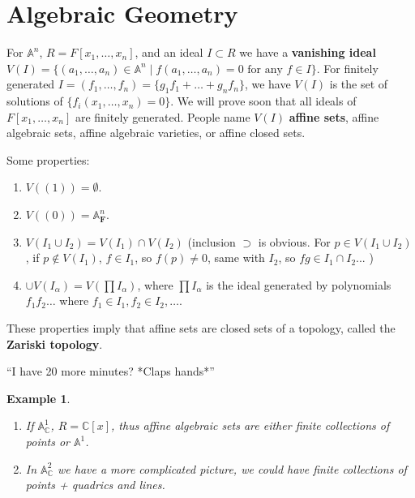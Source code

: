 \documentclass[12pt]{article}
\newcommand{\F}{\mathbf{F}}
\newcommand{\C}{\mathbb{C}}
\newcommand{\A}{\mathbb{A}}
\newtheorem{example}[]{Example}
\begin{document}
\section{Algebraic Geometry}
    For $\A^n$, $R = F[x_1, \dots, x_n]$, and an ideal $I \subset R$ we have a \textbf{vanishing ideal} $V(I) = \{(a_1, \dots, a_n) \in \A^n \mid f(a_1, \dots, a_n) = 0 \text{ for any } f \in I\}$. For finitely generated $I = (f_1,\dots, f_n) = \{g_1f_1 + \dots + g_nf_n\}$, we have $V(I)$ is the set of solutions of $\{f_i(x_1, \dots, x_n) = 0\}$. We will prove soon that all ideals of $F[x_1, \dots, x_n]$ are finitely generated. People name $V(I)$ \textbf{affine sets}, affine algebraic sets, affine algebraic varieties, or affine closed sets. \par 
    Some properties: 
    \begin{enumerate}
        \item $V((1)) = \emptyset$.
        \item $V((0)) = \A^n_\F$.
        \item $V(I_1 \cup I_2) = V(I_1) \cap V(I_2)$ (inclusion $\supset$ is obvious. For $p \in V(I_1 \cup I_2)$, if $p \not \in V(I_1)$, $f \in I_1$, so $f(p) \neq 0$, same with $I_2$, so $fg \in I_1 \cap I_2$... )
        \item $\cup V(I_\alpha) = V(\prod I_\alpha)$, where $\prod I_\alpha$ is the ideal generated by polynomials $f_1f_2\dots $ where $f_1 \in I_1, f_2 \in I_2, \dots$. 
    \end{enumerate}
    These properties imply that affine sets are closed sets of a topology, called the \textbf{Zariski topology}. \par 
    ``I have 20 more minutes? *Claps hands*''\par 
    \begin{example}
        \begin{enumerate}
            \item If $\A_\C^1$, $R = \C[x]$, thus affine algebraic sets are either finite collections of points or $\A^1$.
            \item In $\A^2_\C$ we have a more complicated picture, we could have finite collections of points + quadrics and lines. 
        \end{enumerate}
    \end{example}
\end{document}
